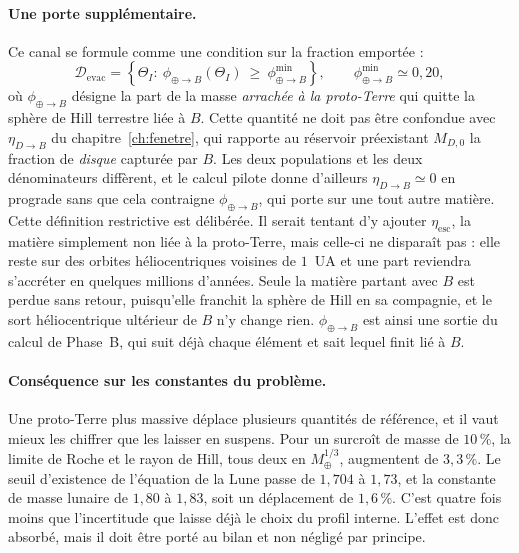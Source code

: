 \documentclass[11pt,a4paper,openany]{report}
\newcommand{\Mt}{M_{\oplus}}
\begin{document}
\paragraph{Une porte supplémentaire.} Ce canal se formule comme une condition sur la fraction
emportée :
\begin{equation}
\mathcal{D}_{\mathrm{evac}}=\left\{\Theta_I:\ \phi_{\oplus\to B}(\Theta_I)\ \ge\ \phi_{\oplus\to B}^{\min}\right\},
\qquad \phi_{\oplus\to B}^{\min}\simeq0{,}20 ,
\label{eq:Devac}
\end{equation}
où $\phi_{\oplus\to B}$ désigne la part de la masse \emph{arrachée à la proto-Terre} qui quitte la sphère de
Hill terrestre liée à $B$. Cette quantité ne doit pas être confondue avec $\eta_{D\to B}$ du
chapitre~\ref{ch:fenetre}, qui rapporte au réservoir préexistant $M_{D,0}$ la fraction de
\emph{disque} capturée par $B$. Les deux populations et les deux dénominateurs diffèrent, et le
calcul pilote donne d'ailleurs $\eta_{D\to B}\simeq0$ en prograde sans que cela contraigne
$\phi_{\oplus\to B}$, qui porte sur une tout autre matière. Cette définition restrictive est
délibérée. Il serait tentant d'y ajouter $\eta_{\mathrm{esc}}$, la matière simplement non liée à la
proto-Terre, mais celle-ci ne disparaît pas : elle reste sur des orbites héliocentriques voisines
de $1$~UA et une part reviendra s'accréter en quelques millions d'années. Seule la matière partant
avec $B$ est perdue sans retour, puisqu'elle franchit la sphère de Hill en sa compagnie, et le sort
héliocentrique ultérieur de $B$ n'y change rien. $\phi_{\oplus\to B}$ est ainsi une sortie du calcul de
Phase~B, qui suit déjà chaque élément et sait lequel finit lié à $B$.

\paragraph{Conséquence sur les constantes du problème.} Une proto-Terre plus massive déplace
plusieurs quantités de référence, et il vaut mieux les chiffrer que les laisser en suspens. Pour un
surcroît de masse de $10\,\%$, la limite de Roche et le rayon de Hill, tous deux en
$\Mt^{1/3}$, augmentent de $3{,}3\,\%$. Le seuil d'existence de l'équation de la Lune passe de
$1{,}704$ à $1{,}73$, et la constante de masse lunaire de $1{,}80$ à $1{,}83$, soit un déplacement
de $1{,}6\,\%$. C'est quatre fois moins que l'incertitude que laisse déjà le choix du profil
interne. L'effet est donc absorbé, mais il doit être porté au bilan et non négligé par principe.
\end{document}
